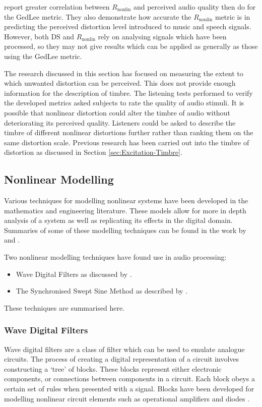 		\citet{tan2004predicting} report greater correlation between $R_{\mathrm{nonlin}}$ and perceived audio
		quality then \citet{lee2003auditory} do for the GedLee metric. They also demonstrate how accurate the
		$R_{\mathrm{nonlin}}$ metric is in predicting the perceived distortion level introduced to music and speech
		signals. However, both $\mathrm{DS}$ and $R_{\mathrm{nonlin}}$ rely on analysing signals which have been
		processed, so they may not give results which can be applied as generally as those using the GedLee metric.

		The research discussed in this section has focused on measuring the extent to which unwanted distortion can
		be perceived. This does not provide enough information for the description of timbre. The listening tests
		performed to verify the developed metrics asked subjects to rate the quality of audio stimuli. It is
		possible that nonlinear distortion could alter the timbre of audio without deteriorating its perceived
		quality. Listeners could be asked to describe the timbre of different nonlinear distortions further rather
		than ranking them on the same distortion scale. Previous research has been carried out into the timbre of
		distortion as discussed in Section \ref{sec:Excitation-Timbre}.

	\subsection{Nonlinear Modelling}
	\label{sec:Excitation-Analysis-Modelling}
		Various techniques for modelling nonlinear systems have been developed in the mathematics and engineering
		literature. These models allow for more in depth analysis of a system as well as replicating its effects in
		the digital domain. Summaries of some of these modelling techniques can be found in the work by
		\citet{janczak2005identification} and \citet{ogunfunmi2007adaptive}.

		Two nonlinear modelling techniques have found use in audio processing:

		\begin{itemize}
			\item Wave Digital Filters as discussed by \citet{fettweis1986wave}.
			\item The Synchronised Swept Sine Method as described by \citet{novak2010nonlinear}.
		\end{itemize}

		These techniques are summarised here.

		\subsubsection{Wave Digital Filters}
			Wave digital filters are a class of filter which can be used to emulate analogue circuits. The
			process of creating a digital representation of a circuit involves constructing a `tree' of blocks.
			These blocks represent either electronic components, or connections between components in a
			circuit. Each block obeys a certain set of rules when presented with a signal. Blocks have been
			developed for modelling nonlinear circuit elements such as operational amplifiers and diodes
			\citep{paiva2012emulation}.

